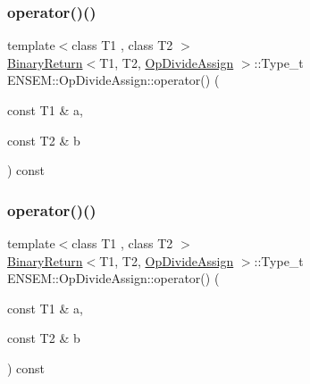 \subsubsection{\texorpdfstring{operator()()}{operator()()}\hspace{0.1cm}{\footnotesize\ttfamily [1/3]}}
{\footnotesize\ttfamily template$<$class T1 , class T2 $>$ \\
\mbox{\hyperlink{structENSEM_1_1BinaryReturn}{Binary\+Return}}$<$T1, T2, \mbox{\hyperlink{structENSEM_1_1OpDivideAssign}{Op\+Divide\+Assign}} $>$\+::Type\+\_\+t E\+N\+S\+E\+M\+::\+Op\+Divide\+Assign\+::operator() (\begin{DoxyParamCaption}\item[{const T1 \&}]{a,  }\item[{const T2 \&}]{b }\end{DoxyParamCaption}) const\hspace{0.3cm}{\ttfamily [inline]}}

\mbox{\label{structENSEM_1_1OpDivideAssign_a16a1ece4c032ceb92428ac26535c4ae9}} 
\subsubsection{\texorpdfstring{operator()()}{operator()()}\hspace{0.1cm}{\footnotesize\ttfamily [2/3]}}
{\footnotesize\ttfamily template$<$class T1 , class T2 $>$ \\
\mbox{\hyperlink{structENSEM_1_1BinaryReturn}{Binary\+Return}}$<$T1, T2, \mbox{\hyperlink{structENSEM_1_1OpDivideAssign}{Op\+Divide\+Assign}} $>$\+::Type\+\_\+t E\+N\+S\+E\+M\+::\+Op\+Divide\+Assign\+::operator() (\begin{DoxyParamCaption}\item[{const T1 \&}]{a,  }\item[{const T2 \&}]{b }\end{DoxyParamCaption}) const\hspace{0.3cm}{\ttfamily [inline]}}

\mbox{\label{structENSEM_1_1OpDivideAssign_a16a1ece4c032ceb92428ac26535c4ae9}} 
